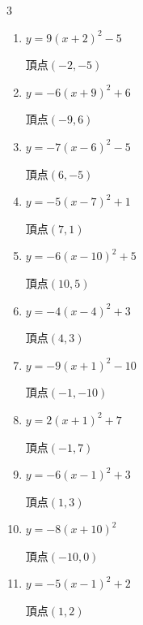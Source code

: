 \begin{multicols}{3}
\begin{enumerate}
        $\displaystyle 頂点\left( 2 , 5 \right)$

  \item $\displaystyle y=9\left( x+2\right)^{2}-5$

        $\displaystyle 頂点\left( -2 , -5 \right)$

  \item $\displaystyle y=-6\left( x+9\right)^{2}+6$

        $\displaystyle 頂点\left( -9 , 6 \right)$

  \item $\displaystyle y=-7\left( x-6\right)^{2}-5$

        $\displaystyle 頂点\left( 6 , -5 \right)$

  \item $\displaystyle y=-5\left( x-7\right)^{2}+1$

        $\displaystyle 頂点\left( 7 , 1 \right)$

  \item $\displaystyle y=-6\left( x-10\right)^{2}+5$

        $\displaystyle 頂点\left( 10 , 5 \right)$

  \item $\displaystyle y=-4\left( x-4\right)^{2}+3$

        $\displaystyle 頂点\left( 4 , 3 \right)$

\columnbreak %

  \item $\displaystyle y=-9\left( x+1\right)^{2}-10$

        $\displaystyle 頂点\left( -1 , -10 \right)$

  \item $\displaystyle y=2\left( x+1\right)^{2}+7$

        $\displaystyle 頂点\left( -1 , 7 \right)$

  \item $\displaystyle y=-6\left( x-1\right)^{2}+3$

        $\displaystyle 頂点\left( 1 , 3 \right)$

  \item $\displaystyle y=-8\left( x+10\right)^{2}$

        $\displaystyle 頂点\left( -10 , 0 \right)$

  \item $\displaystyle y=-5\left( x-1\right)^{2}+2$

        $\displaystyle 頂点\left( 1 , 2 \right)$


\end{enumerate}
\end{multicols}
